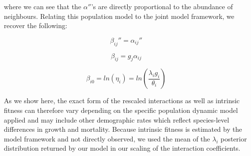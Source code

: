 \documentclass[a4,12pt]{article}
\begin{document}
\begin{itemize}
        where we can see that the ${\alpha}''$'s are directly proportional to the abundance of neighbours. Relating this population model to the joint model framework, we recover the following: 

        \begin{equation}
        {\beta_{ij}}'' = {\alpha_{ij}}''
        \end{equation}

        \begin{equation}
        \beta_{ij} = g_{j} \alpha_{ij}
        \end{equation}

        \begin{equation}
        \beta_{i0}  = ln(\eta_{i}) = ln(\frac{\lambda_{i} g_{i}}{\theta_{i}})
        \end{equation}



        As we show here, the exact form of the rescaled interactions as well as intrinsic fitness can therefore vary depending on the specific population dynamic model applied and may include other demographic rates which reflect species-level differences in growth and mortality. Because intrinsic fitness is estimated by the model framework and not directly observed, we used the mean of the $\lambda_{i}$ posterior distribution returned by our model in our scaling of the interaction coefficients.





\end{itemize}
\end{document}
